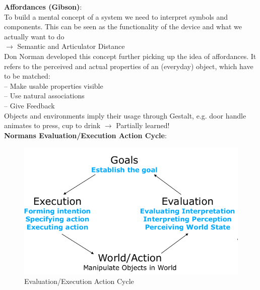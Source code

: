 \textbf{Affordances (Gibson)}:\\
To build a mental concept of a system we need to interpret symbols and components. This can be seen as the functionality of the device and what we actually want to do\\
$\rightarrow$ Semantic and Articulator Distance\\
Don Norman developed this concept further picking up the idea of affordances. It refers to the perceived and actual properties of an (everyday) object, which have to be matched:\\
-- Make usable properties visible\\
-- Use natural associations\\
-- Give Feedback\\
Objects and environments imply their usage through Gestalt, e.g. door handle animates to press, cup to drink $\rightarrow$ Partially learned!\\
\textbf{Normans Evaluation/Execution Action Cycle}:
\begin{figure}[h!]
	\centering
	\includegraphics[width=.4\textwidth]{img/ch05_cycle1.png}
	\caption{Evaluation/Execution Action Cycle}
	\label{cy}
\end{figure}
